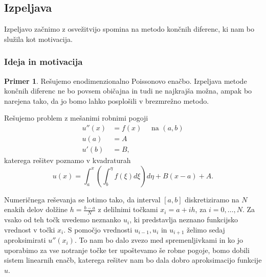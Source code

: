 \documentclass[a4paper,twoside]{article}
\theoremstyle{definition} %
\newtheorem{primer}[definicija]{Primer}
\theoremstyle{plain} %
\numberwithin{equation}{section}
\begin{document}
\subsection{Izpeljava}

Izpeljavo začnimo z osvežitvijo spomina na metodo končnih diferenc, ki nam bo
služila kot motivacija.

\subsubsection{Ideja in motivacija}

\begin{primer}
\label{prim:fdm}
Rešujemo enodimenzionalno Poissonovo enačbo. Izpeljava metode končnih diferenc
ne bo povsem običajna in tudi ne najkrajša možna, ampak bo narejena tako, da
jo bomo lahko posplošili v brezmrežno metodo.

Rešujemo problem z mešanimi robnimi pogoji
\begin{align}
  u''(x) &= f(x) \quad \text{ na } (a, b) \label{eq:example-prob} \\
  u(a) &= A \nonumber \\
  u'(b) &= B, \nonumber
\end{align}
katerega rešitev poznamo v kvadraturah
\[
  u(x) = \int_a^x\left(\int_b^\eta f(\xi) d\xi \right) d\eta + B(x-a) + A.
\]

Numeričnega reševanja se lotimo tako, da interval $[a, b]$ diskretiziramo na
$N$ enakih delov dolžine $h = \frac{b-a}{N}$ z delilnimi točkami $x_i = a + i h$, za $i = 0,
\dots, N$. Za vsako od teh točk uvedemo neznanko $u_i$, ki predstavlja
neznano funkcijsko vrednost v točki $x_i$. S pomočjo vrednosti $u_{i-1}, u_i$
in $u_{i+1}$ želimo sedaj aproksimirati $u''(x_i)$. To nam bo dalo zvezo med
spremenljivkami in ko jo uporabimo za vse notranje točke ter upoštevamo še
robne pogoje, bomo dobili sistem linearnih enačb, katerega rešitev nam bo dala
dobro aproksimacijo funkcije $u$.


\end{primer}
\end{document}
